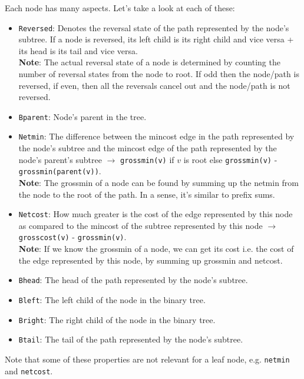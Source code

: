 \documentclass[a4paper, 11pt]{article}
\begin{document}
Each node has many aspects. Let’s take a look at each of these:
\begin{itemize}
    \item \texttt{Reversed}: Denotes the reversal state of the path represented by the node's subtree. If a node is reversed, its left child is its right child and vice versa + its head is its tail and vice versa. \\ \textbf{Note}: The actual reversal state of a node is determined by counting the number of reversal states from the node to root. If odd then the node/path is reversed, if even, then all the reversals cancel out and the node/path is not reversed.
    \item \texttt{Bparent}: Node's parent in the tree.
    \item \texttt{Netmin}: The difference between the mincost edge in the path represented by the node's subtree and the mincost edge of the path represented by the node's parent’s subtree $\rightarrow$ \texttt{grossmin(v)} if $v$ is root else \texttt{grossmin(v)} - \texttt{grossmin(parent(v))}. \\ \textbf{Note}: The grossmin of a node can be found by summing up the netmin from the node to the root of the path. In a sense, it’s similar to prefix sums.
    \item \texttt{Netcost}: How much greater is the cost of the edge represented by this node as compared to the mincost of the subtree represented by this node $\rightarrow$ \texttt{grosscost(v)} - \texttt{grossmin(v)}.
    \\ \textbf{Note}: If we know the grossmin of a node, we can get its cost i.e. the cost of the edge represented by this node, by summing up grossmin and netcost.
    \item \texttt{Bhead}: The head of the path represented by the node's subtree.
    \item \texttt{Bleft}: The left child of the node in the binary tree.
    \item \texttt{Bright}: The right child of the node in the binary tree.
    \item \texttt{Btail}: The tail of the path represented by the node's subtree.
\end{itemize}

Note that some of these properties are not relevant for a leaf node, e.g. \texttt{netmin} and \texttt{netcost}. \\
\end{document}
